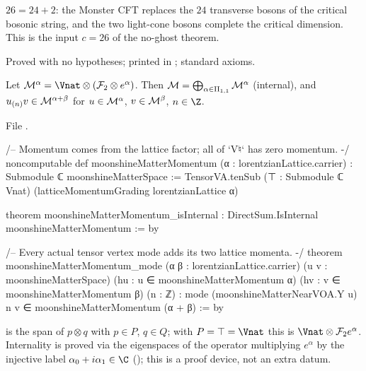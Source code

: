 \begin{physics}
$26=24+2$: the Monster CFT replaces the $24$ transverse bosons of the critical bosonic string, and the two
light-cone bosons complete the critical dimension.  This is the input $c=26$ of the no-ghost theorem.
\end{physics}

\begin{status}
Proved with no hypotheses; printed in ; standard axioms.
\end{status}

\begin{theorem}\label{ch17:thm:mattermomentum}
Let $\chseventeenM^\alpha=\Vnat\otimes(\chseventeenF_2\otimes e^\alpha)$.  Then $\mathcal{M}=\bigoplus_{\alpha\in{\mathrm{II}_{1,1}}}\mathcal{M}^\alpha$
(internal), and $u_{(n)}v\in\mathcal{M}^{\alpha+\beta}$ for $u\in\mathcal{M}^\alpha$, $v\in\mathcal{M}^\beta$, $n\in\Z$.
\end{theorem}

\noindent File .
\begin{leancode}
/-- Momentum comes from the lattice factor; all of `V♮` has zero momentum. -/
noncomputable def moonshineMatterMomentum (α : lorentzianLattice.carrier) : Submodule ℂ moonshineMatterSpace :=
  TensorVA.tenSub (⊤ : Submodule ℂ Vnat) (latticeMomentumGrading lorentzianLattice α)

theorem moonshineMatterMomentum_isInternal : DirectSum.IsInternal moonshineMatterMomentum := by

/-- Every actual tensor vertex mode adds its two lattice momenta. -/
theorem moonshineMatterMomentum_mode (α β : lorentzianLattice.carrier)
    (u v : moonshineMatterSpace) (hu : u ∈ moonshineMatterMomentum α)
    (hv : v ∈ moonshineMatterMomentum β) (n : ℤ) :
    mode (moonshineMatterNearVOA.Y u) n v ∈ moonshineMatterMomentum (α + β) := by
\end{leancode}

\begin{dictionary}
 is the span of $p\otimes q$ with $p\in P$, $q\in Q$; with $P=\top=\Vnat$ this is
$\Vnat\otimes\chseventeenF_2e^\alpha$.  Internality is proved via the eigenspaces of the operator multiplying $e^\alpha$ by the
injective label $\alpha_0+i\alpha_1\in\C$ (); this is a proof device, not an extra datum.
\end{dictionary}

